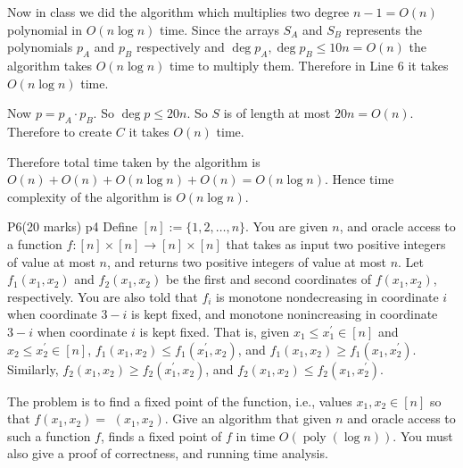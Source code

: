 \documentclass[a4paper, 11pt]{article}
\begin{document}
{ Now in class we did the  algorithm which multiplies two degree $n-1=O(n)$ polynomial in $O(n\log n)$ time. Since the arrays $S_A$ and $S_B$ represents the polynomials $p_A$ and $p_B$ respectively and $\deg p_A,\deg p_B \leq 10n=O(n)$ the  algorithm takes $O(n\log n)$ time to multiply them. Therefore in Line 6 it takes $O(n\log n)$ time.
 
 Now $p=p_A\cdot p_B$. So $\deg p\leq 20n$. So $S$ is of length at most $20n=O(n)$. Therefore to create $C$ it takes $O(n)$ time. 
 
 Therefore total time taken by the algorithm is $O(n)+O(n)+O(n\log n)+O(n)=O(n\log n)$. Hence time complexity of the algorithm is $O(n\log n)$.
}
\newpage




\begin{problem}{%
		P6\hfill  (20 marks)
	}{p4%
	}
	Define $[n]:=\{1,2, \ldots, n\}$. You are given $n$, and oracle access to a function $f:[n] \times[n] \rightarrow[n] \times[n]$ that takes as input two positive integers of value at most $n$, and returns two positive integers of value at most $n$. Let $f_1\left(x_1, x_2\right)$ and $f_2\left(x_1, x_2\right)$ be the first and second coordinates of $f\left(x_1, x_2\right)$, respectively. You are also told that $f_i$ is monotone nondecreasing in coordinate $i$ when coordinate $3-i$ is kept fixed, and monotone nonincreasing in coordinate $3-i$ when coordinate $i$ is kept fixed. That is, given $x_1 \leq x_1^{\prime} \in[n]$ and $x_2 \leq x_2^{\prime} \in[n]$, $f_1\left(x_1, x_2\right) \leq f_1\left(x_1^{\prime}, x_2\right)$, and $f_1\left(x_1, x_2\right) \geq f_1\left(x_1, x_2^{\prime}\right)$. Similarly, $f_2\left(x_1, x_2\right) \geq f_2\left(x_1^{\prime}, x_2\right)$, and $f_2\left(x_1, x_2\right) \leq f_2\left(x_1, x_2^{\prime}\right)$.\parinn
	
	The problem is to find a fixed point of the function, i.e., values $x_1, x_2 \in[n]$ so that $f\left(x_1, x_2\right)=$ $\left(x_1, x_2\right)$. Give an algorithm that given $n$ and oracle access to such a function $f$, finds a fixed point of $f$ in time $O(\operatorname{poly}(\log n))$. You must also give a proof of correctness, and running time analysis.
\end{problem}
\end{document}
